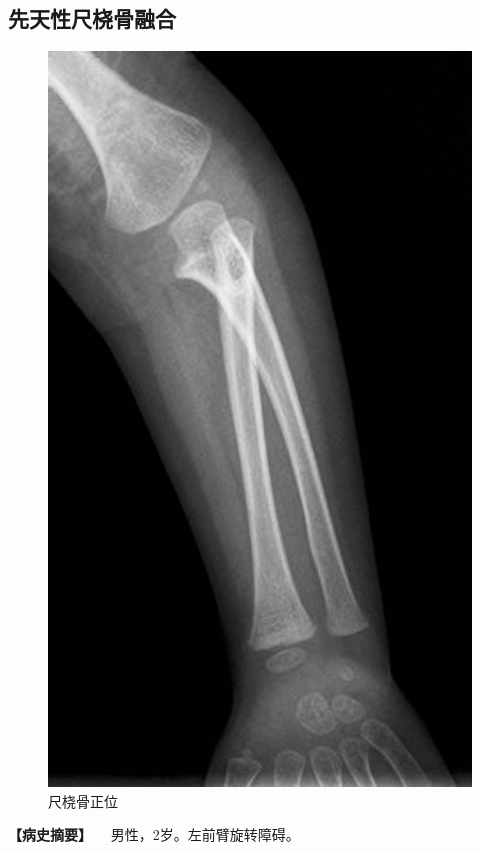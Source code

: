 \subsection{先天性尺桡骨融合}

\begin{figure}[!htbp]
 \centering
 \includegraphics{./images/Image00022.jpg}
 \captionsetup{justification=centering}
 \caption{尺桡骨正位}
 \label{fig2-2-5}
  \end{figure} 

\textbf{【病史摘要】} 　男性，2岁。左前臂旋转障碍。

